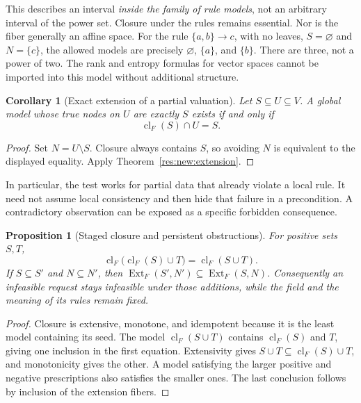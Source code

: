 \documentclass[11pt,oneside]{article}
\theoremstyle{komorebiplain}
\newtheorem{proposition}[theorem]{Proposition}
\newtheorem{corollary}[theorem]{Corollary}
\theoremstyle{komorebidefinition}
\theoremstyle{komorebiremark}
\begin{document}
This describes an interval \emph{inside the family of rule models}, not an arbitrary interval of the power set. Closure under the rules remains essential. Nor is the fiber generally an affine space. For the rule $\{a,b\}\to c$, with no leaves, $S=\varnothing$ and $N=\{c\}$, the allowed models are precisely $\varnothing$, $\{a\}$, and $\{b\}$. There are three, not a power of two. The rank and entropy formulas for vector spaces cannot be imported into this model without additional structure.

\begin{corollary}[Exact extension of a partial valuation]
\label{res:new:partial}
Let $S\subseteq U\subseteq V$. A global model whose true nodes on $U$ are exactly $S$ exists if and only if
\[
 \operatorname{cl}_F(S)\cap U=S.
\]
\end{corollary}
\begin{proof}
Set $N=U\setminus S$. Closure always contains $S$, so avoiding $N$ is equivalent to the displayed equality. Apply Theorem~\ref{res:new:extension}.
\end{proof}

In particular, the test works for partial data that already violate a local rule. It need not assume local consistency and then hide that failure in a precondition. A contradictory observation can be exposed as a specific forbidden consequence.

\begin{proposition}[Staged closure and persistent obstructions]
\label{res:new:stages}
For positive sets $S,T$,
\[
 \operatorname{cl}_F\bigl(\operatorname{cl}_F(S)\cup T\bigr)
   =\operatorname{cl}_F(S\cup T).
\]
If $S\subseteq S'$ and $N\subseteq N'$, then
$\operatorname{Ext}_F(S',N')\subseteq\operatorname{Ext}_F(S,N)$.
Consequently an infeasible request stays infeasible under those additions, while the field and the meaning of its rules remain fixed.
\end{proposition}
\begin{proof}
Closure is extensive, monotone, and idempotent because it is the least model containing its seed. The model $\operatorname{cl}_F(S\cup T)$ contains $\operatorname{cl}_F(S)$ and $T$, giving one inclusion in the first equation. Extensivity gives $S\cup T\subseteq\operatorname{cl}_F(S)\cup T$, and monotonicity gives the other. A model satisfying the larger positive and negative prescriptions also satisfies the smaller ones. The last conclusion follows by inclusion of the extension fibers.
\end{proof}
\end{document}
